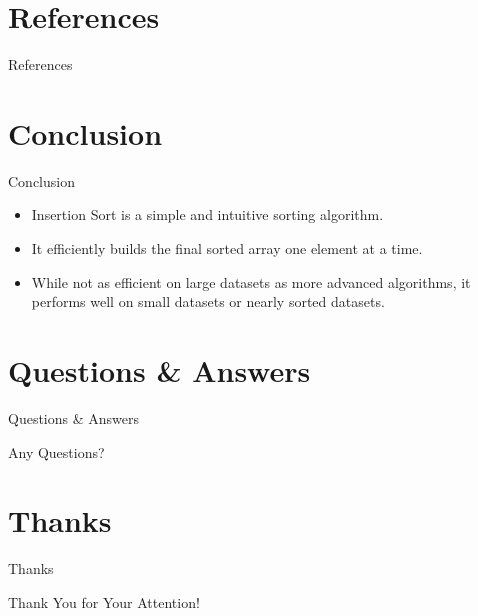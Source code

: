 \documentclass{beamer}
\begin{document}
\section{References}
\begin{frame}[shrink=20]{References}
    \nocite{*} 
    
    
\end{frame}



\section{Conclusion}
\begin{frame}{Conclusion}
  \begin{itemize}
    \item Insertion Sort is a simple and intuitive sorting algorithm.
    \item It efficiently builds the final sorted array one element at a time.
    \item While not as efficient on large datasets as more advanced algorithms, it performs well on small datasets or nearly sorted datasets.
  \end{itemize}
\end{frame}

\section{Questions \& Answers}
\begin{frame}{Questions \& Answers}
  \begin{center}
    \Huge Any Questions?
  \end{center}
\end{frame}

\section{Thanks}
\begin{frame}{Thanks}
  \begin{center}
    \Huge Thank You for Your Attention!
  \end{center}
\end{frame}
\end{document}
